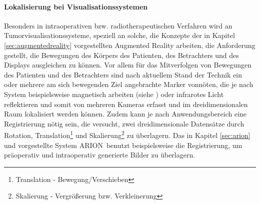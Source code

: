 \documentclass[pdftex,a4paper,titlepage,12pt]{scrartcl}
\newtheorem[L]{boxedDefinition}{Definition}
\begin{document}
\paragraph{Lokalisierung bei Visualisationssystemen}
Besonders in intraoperativen bzw. radiotherapeutischen Verfahren wird an Tumorvisualisationssysteme, speziell an solche, die Konzepte der in Kapitel \ref{sec:augmentedreality} vorgestellten Augmented Reality arbeiten, die Anforderung gestellt, die Bewegungen des Körpers des Patienten, des Betrachters und des Displays ausgleichen zu können. Vor allem für das Mitverfolgen von Bewegungen des Patienten und des Betrachters sind nach aktuellem Stand der Technik ein oder mehrere am sich bewegenden Ziel angebrachte Marker vonnöten, die je nach System beispielsweise magnetisch arbeiten (siehe \cite{Suthau2002DE}) oder infrarotes Licht reflektieren und somit von mehreren Kameras erfasst und im dreidimensionalen Raum lokalisiert werden können. Zudem kann je nach Anwendungsbereich eine Registrierung nötig sein, die versucht, zwei dreidimensionale Datensätze durch Rotation, Translation\footnote{Translation - Bewegung/Verschieben} und Skalierung\footnote{Skalierung - Vergrößerung bzw. Verkleinerung} zu überlagern. Das in Kapitel \vref{sec:arion} und \cite{Suthau2002DE} vorgestellte System ARION\texttrademark\ benutzt beispielsweise die Registrierung, um präoperativ und intraoperativ generierte Bilder zu überlagern. 
 
\end{document}
